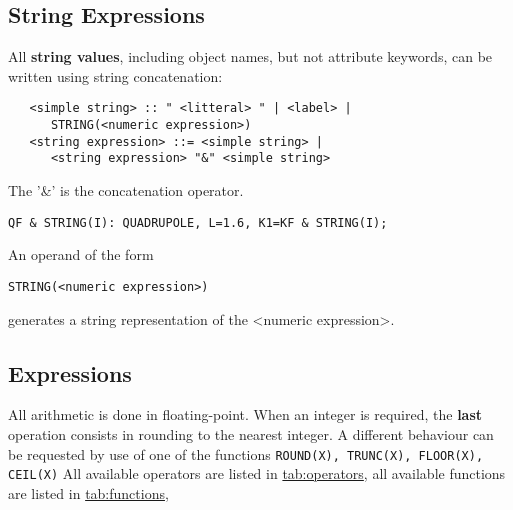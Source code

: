 \documentclass{article}
\newcommand{\tabref}[2]{\hyperref{#1}{#1 (see Table~}{)}{tab:#2}}
\begin{document}
\subsection{String Expressions}
\label{sec:string}
All \textbf{string values}, including object names,
but not attribute keywords,
can be written using string concatenation:
\begin{verbatim}
   <simple string> :: " <litteral> " | <label> |
      STRING(<numeric expression>)
   <string expression> ::= <simple string> |
      <string expression> "&" <simple string>
\end{verbatim}
The '\&' is the concatenation operator.
\begin{verbatim}
QF & STRING(I): QUADRUPOLE, L=1.6, K1=KF & STRING(I);
\end{verbatim}
An operand of the form
\begin{verbatim}
STRING(<numeric expression>)
\end{verbatim}
generates a string representation of the <numeric expression>.

\subsection{Expressions}
All arithmetic is done in floating-point.
When an integer is required, the \textbf{last} operation consists in rounding
to the nearest integer.
A different behaviour can be requested by use of one of the functions
\texttt{ROUND(X), TRUNC(X), FLOOR(X), CEIL(X)}
All available operators are listed in \tabref{operators}{operators},
all available functions are listed in \tabref{functions}{functions},
\end{document}
